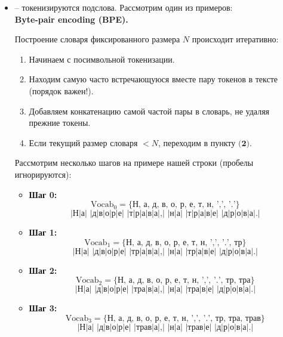 \documentclass[12pt]{article}
\theoremstyle{definition} %
\theoremstyle{plain} %
\theoremstyle{remark} %
\begin{document}
\begin{itemize}
    \pagebreak 
    
    \item {} -- токенизируются подслова. Рассмотрим один из примеров: \\

    \textbf{Byte-pair encoding (BPE).} 

    Построение словаря фиксированного размера $N$ происходит итеративно:
    \begin{enumerate}
        \item[\textbf{1.}]
        Начинаем с посимвольной токенизации.
        \item[\textbf{2.}]
        Находим самую часто встречающуюся вместе пару токенов в тексте (порядок важен!).
        \item[\textbf{3.}]
        Добавляем конкатенацию самой частой пары в словарь, не удаляя прежние токены.
        \item[\textbf{4.}]
        Если текущий размер словаря $< N$, переходим в пункту $\textbf{(2)}$.
    \end{enumerate}

    Рассмотрим несколько шагов на примере нашей строки (пробелы игнорируются):
    \begin{itemize}
        \item[] \textbf{Шаг 0: }
        \[
        \text{Vocab}_0 = \{\textit{Н, а, д, в, о, р, е, т, н, ',', '.'}\}
        \]
        \[
        \textit{|Н|а| |д|в|о|р|е| |т|р|а|в|а|,| |н|а| |т|р|а|в|е| |д|р|о|в|а|.|}
        \]
        \item[] \textbf{Шаг 1: }
        \[
        \text{Vocab}_1 = \{\textit{Н, а, д, в, о, р, е, т, н, ',', '.', тр}\}
        \]
        \[
        \textit{|Н|а| |д|в|о|р|е| |тр|а|в|а|,| |н|а| |тр|а|в|е| |д|р|о|в|а|.|}
        \]
        \item[] \textbf{Шаг 2: }
        \[
        \text{Vocab}_2 = \{\textit{Н, а, д, в, о, р, е, т, н, ',', '.', тр, тра}\}
        \]
        \[
        \textit{|Н|а| |д|в|о|р|е| |тра|в|а|,| |н|а| |тра|в|е| |д|р|о|в|а|.|}
        \]
        \item[] \textbf{Шаг 3: }
        \[
        \text{Vocab}_3 = \{\textit{Н, а, д, в, о, р, е, т, н, ',', '.', тр, тра, трав}\}
        \]
        \[
        \textit{|Н|а| |д|в|о|р|е| |трав|а|,| |н|а| |трав|е| |д|р|о|в|а|.|}
        \]
    \end{itemize}


\end{itemize}
\end{document}
